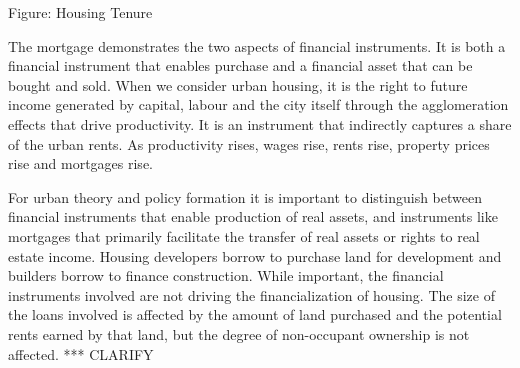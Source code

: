 Figure: Housing Tenure 

The mortgage demonstrates the two aspects of financial instruments. It is both a financial instrument that enables  purchase and a financial asset that can be bought and sold. When we consider urban housing, it is the right to future income generated by capital, labour and the city itself through the agglomeration effects that drive productivity. It is an instrument that indirectly captures a share of the urban rents. As productivity rises, wages rise, rents rise, property prices rise and mortgages rise. 

For urban theory and policy formation it is important to distinguish between financial instruments that enable production of real assets, and instruments like  mortgages that primarily facilitate the transfer of real assets or rights to real estate  income. Housing developers borrow to purchase land for development and builders borrow to finance construction. While important, the financial instruments involved are not driving the financialization of housing.  The size of the loans involved is affected by the amount of land purchased and the potential rents earned by that land, but the degree of non-occupant ownership is not affected. *** CLARIFY
  
\begin{center}
\end{center}

